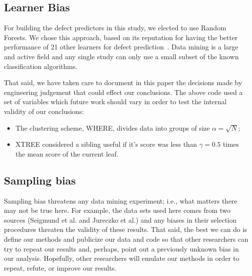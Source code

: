 \documentclass{sig-alternate}
\newcommand{\bi}{\begin{itemize}}
\newcommand{\ei}{\end{itemize}}
\newcommand{\tion}[1]{\textsection\ref{sect:#1}}
\begin{document}
{\begin{itemize}[leftmargin=3mm]

\subsection{ Learner Bias}
For building the defect predictors in this study, we elected
to use  Random Forests. We chose this approach,  based on its reputation for having the better  performance of 21 other learners for defect prediction~\cite{lessmann}. Data mining is a large and active field and any single study can only use a small subset of the known classification algorithms.  

That said, we have taken care to document in this paper the decisions made by engineering
judgement that could effect our conclusions. The above code used a set of variables which future
work should vary in order to test the internal validity of our conclusions:

\bi
\item The clustering scheme, WHERE, divides data into groups of size $\alpha=\sqrt{N}$;
\item XTREE considered a sibling useful if it's score was less than $\gamma=0.5$ times the mean score of the current leaf.
 \ei

\subsection{  Sampling bias} 
Sampling bias threatens any data mining experiment; i.e., what matters
there may not be true here. For example, the data sets used here comes from two sources
(Seigmund et al. and Jureczko et al.) and any biases in their selection procedures
threaten the validity of these results. 
That said,
the best we can do is define our methods and publicize our data and code so that other researchers can
try to repeat our results and, perhaps, point out a previously unknown bias
in our analysis. Hopefully, other researchers will emulate our methods in
order to repeat, refute, or improve our results. 




\end{itemize}}
\end{document}
